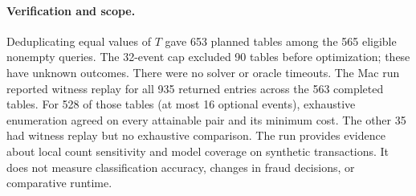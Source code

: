 \paragraph{Verification and scope.}
Deduplicating equal values of $T$ gave 653 planned tables among the 565
eligible nonempty queries. The 32-event cap excluded 90 tables before
optimization; these have unknown outcomes. There were no solver or oracle
timeouts. The Mac run reported witness replay for all 935 returned entries
across the 563 completed tables. For 528 of those tables (at most 16
optional events), exhaustive enumeration agreed on every attainable pair
and its minimum cost. The other 35 had witness replay but no exhaustive
comparison. The run provides evidence about local count sensitivity and
model coverage on synthetic transactions. It does not measure classification
accuracy, changes in fraud decisions, or comparative runtime.
